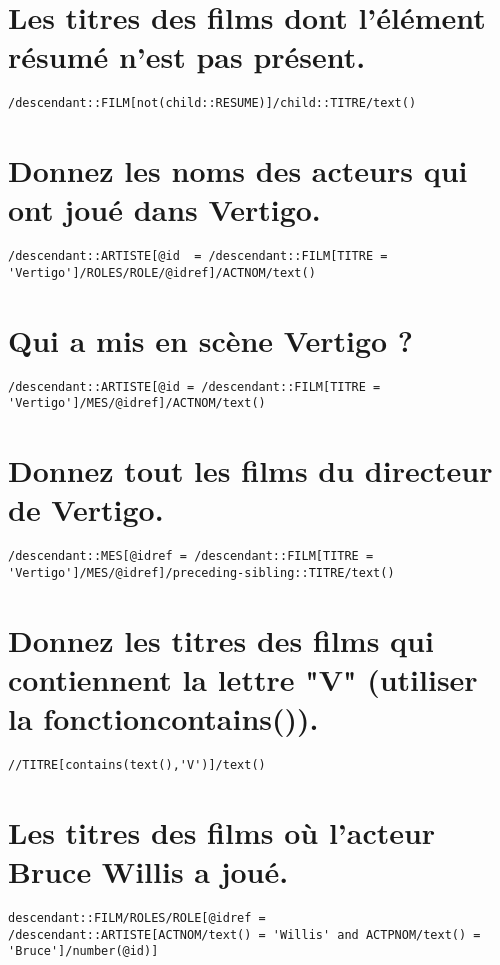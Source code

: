 \section{Les titres des films dont l’élément résumé n’est pas présent.}
\begin{verbatim}
/descendant::FILM[not(child::RESUME)]/child::TITRE/text()
\end{verbatim}

\section{Donnez les noms des acteurs qui ont joué dans Vertigo.}
\begin{verbatim}
/descendant::ARTISTE[@id  = /descendant::FILM[TITRE = 'Vertigo']/ROLES/ROLE/@idref]/ACTNOM/text() 
\end{verbatim}

\section{Qui a mis en scène Vertigo ?}
\begin{verbatim}
/descendant::ARTISTE[@id = /descendant::FILM[TITRE = 'Vertigo']/MES/@idref]/ACTNOM/text()
\end{verbatim}

\section{Donnez tout les films du directeur de Vertigo.}
\begin{verbatim}
/descendant::MES[@idref = /descendant::FILM[TITRE = 'Vertigo']/MES/@idref]/preceding-sibling::TITRE/text()
\end{verbatim}

\section{Donnez les titres des films qui contiennent la lettre "V" (utiliser la fonctioncontains()).}
\begin{verbatim}
//TITRE[contains(text(),'V')]/text()
\end{verbatim}

\section{Les titres des films où l’acteur Bruce Willis a joué.}
\begin{verbatim}
descendant::FILM/ROLES/ROLE[@idref = /descendant::ARTISTE[ACTNOM/text() = 'Willis' and ACTPNOM/text() = 'Bruce']/number(@id)]
\end{verbatim}

